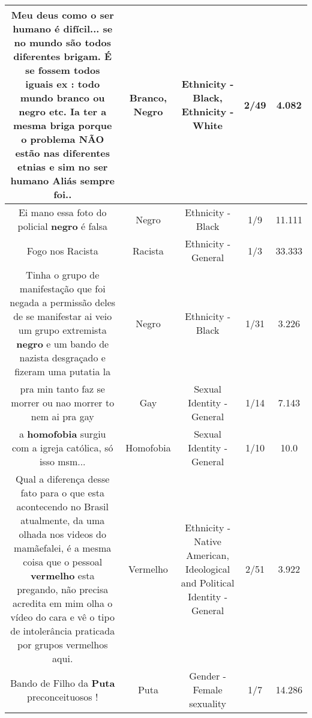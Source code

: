 \documentclass[11pt]{article}
\newlength\mylength
\begin{document}
\begin{center}
\begin{longtable}{|C{.65\mylength}|C{.30\mylength}|C{.12\mylength}|C{.12\mylength}|C{.12\mylength}|}
  \small Meu deus como o ser humano é difícil... se no mundo são todos diferentes brigam. É se fossem todos iguais ex : todo mundo \textbf{branco} ou \textbf{negro} etc. Ia ter a mesma briga porque o problema NÃO estão nas diferentes etnias e sim no ser humano Aliás sempre foi..\normalsize   & Branco, Negro & Ethnicity - Black, Ethnicity - White & 2/49 & 4.082 \\  \hline
  \small Ei mano essa foto do policial \textbf{negro} é falsa\normalsize   & Negro & Ethnicity - Black & 1/9 & 11.111 \\  \hline
  \small Fogo nos Racista\normalsize   & Racista & Ethnicity - General & 1/3 & 33.333 \\  \hline
  \small Tinha o grupo de manifestação que foi negada a permissão deles de se manifestar ai veio um grupo extremista \textbf{negro} e um bando de nazista desgraçado e fizeram uma putatia la\normalsize   & Negro & Ethnicity - Black & 1/31 & 3.226 \\  \hline
  \small pra min tanto faz se morrer ou nao morrer to nem ai pra gay\normalsize   & Gay & Sexual Identity - General & 1/14 & 7.143 \\  \hline
  \small a \textbf{homofobia} surgiu com a igreja católica, só isso msm...\normalsize   & Homofobia & Sexual Identity - General & 1/10 & 10.0 \\  \hline
  \small Qual a diferença desse fato para o que esta acontecendo no Brasil atualmente, da uma olhada nos videos do mamãefalei, é a mesma coisa que o pessoal \textbf{v\textbf{ermelho}} esta pregando, não precisa acredita em mim olha o vídeo do cara e vê o tipo de intolerância praticada por grupos vermelhos aqui.\normalsize   & Vermelho & Ethnicity - Native American, Ideological and Political Identity - General & 2/51 & 3.922 \\  \hline
  \small Bando de Filho da \textbf{Puta} preconceituosos !\normalsize   & Puta & Gender - Female sexuality & 1/7 & 14.286 \\  \hline

\end{longtable}
\end{center}
\end{document}
